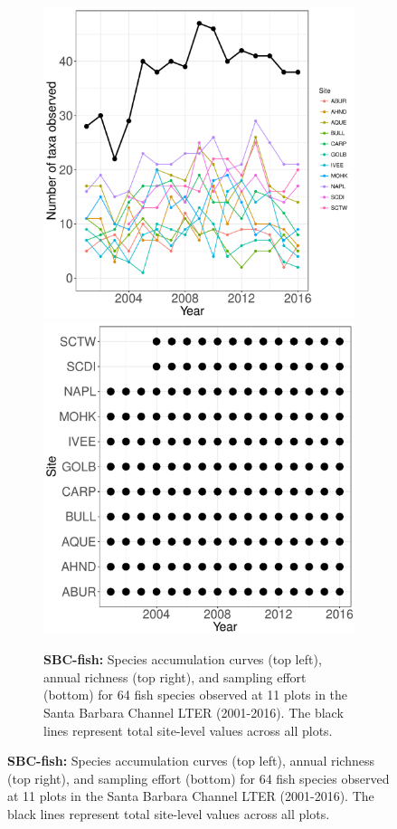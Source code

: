 \documentclass[11pt, oneside]{article}
\begin{document}
\begin{figure}[h!]
\begin{figure}[h!]
\includegraphics[scale = 0.4]{sbc-fish-castorani_num_taxa_over_time.pdf}
\includegraphics[scale = 0.4]{sbc-fish-castorani_spatiotemporal_sampling_effort.pdf}
\caption{{\bf SBC-fish:} Species accumulation curves (top left),  annual richness (top right), and sampling effort (bottom)  for 64 fish species observed at 11 plots in the Santa Barbara Channel LTER (2001-2016). The black lines represent total site-level values across all plots.}
\label{sbc-fish}
\end{figure}


\end{figure}
\end{document}
